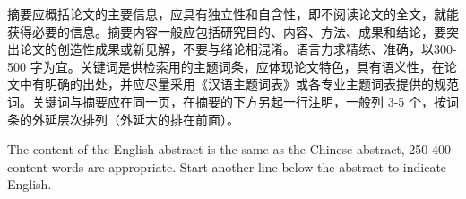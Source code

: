

\begin{chineseabstract}

摘要应概括论文的主要信息，应具有独立性和自含性，即不阅读论文的全文，就能获得必要的信息。摘要内容一般应包括研究目的、内容、方法、成果和结论，要突出论文的创造性成果或新见解，不要与绪论相混淆。语言力求精练、准确，以300-500 字为宜。关键词是供检索用的主题词条，应体现论文特色，具有语义性，在论文中有明确的出处，并应尽量采用《汉语主题词表》或各专业主题词表提供的规范词。关键词与摘要应在同一页，在摘要的下方另起一行注明，一般列 3-5 个，按词条的外延层次排列（外延大的排在前面）。

\end{chineseabstract}

\begin{englishabstract}

The content of the English abstract is the same as the Chinese abstract, 250-400 content words are appropriate. Start another line below the abstract to indicate English.

\end{englishabstract}